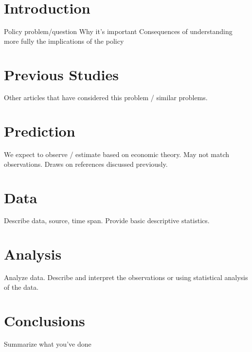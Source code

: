 \documentclass[12pt,twocolumn]{article}
\begin{document}
\section{Introduction}
Policy problem/question
Why it's important
Consequences of understanding more fully the implications of the policy

\section{Previous Studies}
Other articles that have considered this problem / similar problems.

\section{Prediction}
We expect to observe / estimate based on economic theory. May not match observations. Draws on references discussed previously. 

\section{Data}
Describe data, source, time span. Provide basic descriptive statistics.

\section{Analysis}
Analyze data. Describe and interpret the observations or using statistical analysis of the data.

\section{Conclusions}
Summarize what you've done
\end{document}
